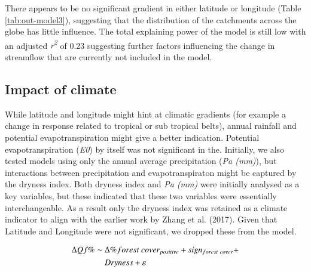 \documentclass[]{elsarticle} %
\begin{document}
There appears to be no significant gradient in either latitude or longitude (Table \ref{tab:out-model3}), suggesting that the distribution of the catchments across the globe has little influence. The total explaining power of the model is still low with an adjusted \emph{r\textsuperscript{2}} of 0.23 suggesting further factors influencing the change in streamflow that are currently not included in the model.

\hypertarget{impact-of-climate}{%
\subsection{Impact of climate}\label{impact-of-climate}}

While latitude and longitude might hint at climatic gradients (for example a change in response related to tropical or sub tropical belts), annual rainfall and potential evapotranspiration might give a better indication.
Potential evapotranspiration (\emph{E0}) by itself was not significant in the. Initially, we also tested models using only the annual average precipitation (\emph{Pa (mm)}), but interactions between precipitation and evapotranspiraton might be captured by the dryness index. Both dryness index and \emph{Pa (mm)} were initially analysed as a key variables, but these indicated that these two variables were essentially interchangeable. As a result only the dryness index was retained as a climate indicator to align with the earlier work by Zhang et al. (2017). Given that Latitude and Longitude were not significant, we dropped these from the model.

\begin{align}
\Delta Qf \% \sim ~ & \Delta \% forest~cover_{positive} + sign_{forest~cover} + \notag \\ & Dryness  + \varepsilon \label{eq:eq5}
\end{align}
\end{document}
